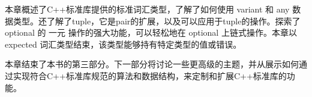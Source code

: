 本章概述了C++标准库提供的标准词汇类型，了解了如何使用 variant 和 any 数据类型。还了解了tuple，它是pair的扩展，以及可以应用于tuple的操作。探索了 optional 的 一元 操作的强大功能，可以轻松地在 optional 上链式操作。本章以 expected 词汇类型结束，该类型能够持有特定类型的值或错误。

本章结束了本书的第三部分。下一部分将讨论一些更高级的主题，并从展示如何通过实现符合C++标准库规范的算法和数据结构，来定制和扩展C++标准库的功能。
